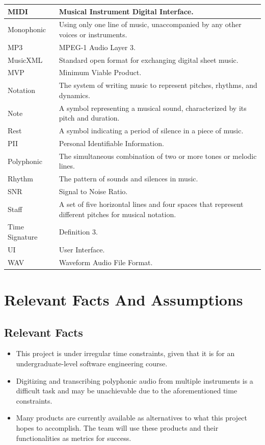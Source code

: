\documentclass[12pt]{article}
\begin{document}
\begin{longtable}{|l|p{12cm}|}
\hline
MIDI & Musical Instrument Digital Interface. \\ 
\hline
Monophonic & Using only one line of music, unaccompanied by any other voices or instruments. \\ 
\hline
MP3 & MPEG-1 Audio Layer 3. \\ 
\hline
MusicXML & Standard open format for exchanging digital sheet music. \\ 
\hline
MVP & Minimum Viable Product. \\ 
\hline
Notation & The system of writing music to represent pitches, rhythms, and dynamics. \\ 
\hline
Note & A symbol representing a musical sound, characterized by its pitch and duration. \\ 
\hline
Rest & A symbol indicating a period of silence in a piece of music. \\ 
\hline
PII & Personal Identifiable Information. \\ 
\hline
Polyphonic & The simultaneous combination of two or more tones or melodic lines. \\ 
\hline
Rhythm & The pattern of sounds and silences in music. \\ 
\hline
SNR & Signal to Noise Ratio. \\ 
\hline
Staff & A set of five horizontal lines and four spaces that represent different pitches for musical notation. \\ 
\hline
Time Signature & Definition 3. \\ 
\hline
UI & User Interface. \\ 
\hline
WAV & Waveform Audio File Format. \\ 
\hline

\end{longtable}

\section{Relevant Facts And Assumptions}
\subsection{Relevant Facts}
\begin{itemize}
  \item This project is under irregular time constraints, given that it is 
  for an undergraduate-level software engineering course. 
  \item Digitizing and transcribing polyphonic audio from multiple instruments
   is a difficult task and may be unachievable due to the aforementioned time constraints. 
  \item Many products are currently available as alternatives to what this project hopes 
  to accomplish. The team will use these products and their functionalities as metrics for success.
\end{itemize}
\end{document}
